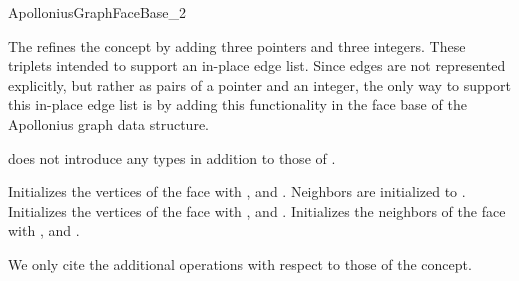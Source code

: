 
\begin{ccRefConcept}{ApolloniusGraphFaceBase_2}

\ccDefinition
The  refines the
 concept by adding three 
pointers and three integers. These triplets intended to support an
in-place edge list. Since edges are not represented explicitly, but
rather as pairs of a  pointer and an integer, the only way
to support this in-place edge list is by adding this functionality in
the face base of the Apollonius graph data structure.

\ccRefines
{}

\ccTypes
{} does not introduce any
types in addition to those of .

\ccCreation
{}
%
{}
{Initializes the vertices of the face with ,  and
. Neighbors are initialized to .}
{}
{Initializes the vertices of the face with ,  and
. Initializes the neighbors of the face with ,
 and .}


We only cite the additional operations with respect to those of the
 concept.


\end{ccRefConcept}
